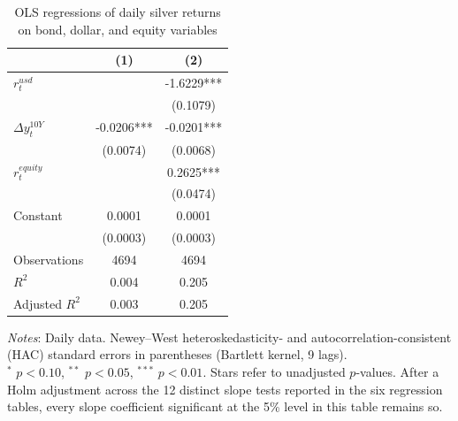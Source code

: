 \begin{table}[H]
\centering
\caption{OLS regressions of daily silver returns on bond, dollar, and equity variables}
\label{tab:ols_silver_bond}
\begin{tabular}{lcc}
\toprule
 & (1) & (2) \\
\midrule
$r^{usd}_t$ &  & -1.6229*** \\
 &  & (0.1079) \\
$\Delta y^{10Y}_t$ & -0.0206*** & -0.0201*** \\
 & (0.0074) & (0.0068) \\
$r^{equity}_t$ &  & 0.2625*** \\
 &  & (0.0474) \\
Constant & 0.0001 & 0.0001 \\
 & (0.0003) & (0.0003) \\
Observations & 4694 & 4694 \\
$R^2$ & 0.004 & 0.205 \\
Adjusted $R^2$ & 0.003 & 0.205 \\
\bottomrule
\end{tabular}

\vspace{0.2cm}
\begin{minipage}{0.9\textwidth}
\footnotesize
\textit{Notes}: Daily data. Newey--West heteroskedasticity- and autocorrelation-consistent (HAC) standard errors in parentheses (Bartlett kernel, 9 lags).\\
$^*$ $p<0.10$, $^{**}$ $p<0.05$, $^{***}$ $p<0.01$. Stars refer to unadjusted $p$-values. After a Holm adjustment across the 12 distinct slope tests reported in the six regression tables, every slope coefficient significant at the 5\% level in this table remains so.
\end{minipage}
\end{table}
